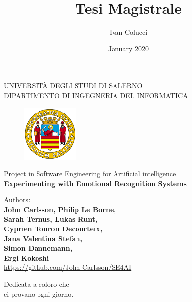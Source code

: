 \documentclass[a4paper, 12pt, oneside]{book}
\title{Tesi Magistrale}
\author{Ivan Colucci}
\date{January 2020}
\newenvironment{dedication}
  {\clearpage           %
   \thispagestyle{empty}%
   \vspace*{\stretch{1}}%
   \itshape             %
   \raggedleft          %
  }
  {\par %
   \vspace{\stretch{3}} %
   \clearpage           %
  }
\begin{document}
\begin{titlepage}
    \begin{center}
        \LARGE{\uppercase{Università degli Studi di Salerno}}\\
        \vspace{5mm}
    	\uppercase{\normalsize Dipartimento di Ingegneria del informatica }\\
    \end{center}
    \begin{figure}[H]
        \centering
        \includegraphics[width=0.25\textwidth]{logo_unisa}
    \end{figure}
    
    \begin{center}
    	\normalsize{Project in Software Engineering for Artificial intelligence}\\
    	\vspace{15mm}
        {\LARGE{\bf Experimenting with Emotional Recognition Systems}}\\
    	\vspace{3mm}
    \end{center}
    
    \vspace{7mm}
    \noindent
    \begin{center}
    	{\large{ Authors:\\\bf John Carlsson, 
                 Philip Le Borne, \\
                 Sarah Ternus,
                 Lukas Runt,\\
                 Cyprien Touron Decourteix,\\
                 Jana Valentina Stefan,\\
                 Simon Dannemann,\\
                 Ergi Kokoshi}}
    	\vspace{12mm}\\
    
    \url{https://github.com/John-Carlsson/SE4AI}
    	
    \end{center}
    
    \hfill
    

\end{titlepage}
\begin{dedication}
Dedicata a coloro che\\ ci provano ogni giorno.
\end{dedication}
\end{document}
